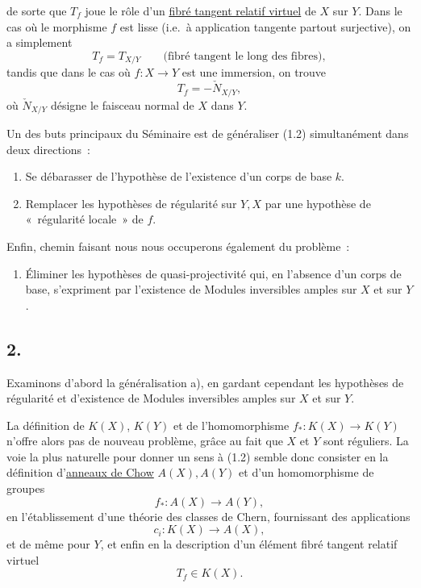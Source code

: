 de
sorte que $T_f$ joue le rôle d'un \underline{fibré tangent relatif virtuel} de $X$ sur $Y$. Dans le cas où le morphisme $f$ est lisse (i.e.\ à application tangente partout surjective), on a simplement
\[
T_f=T_{X/Y}\qquad\text{(fibré tangent le long des fibres)},
\]
tandis que dans le cas où $f:X\to Y$ est une immersion, on trouve
\[
T_f=-\check N_{X/Y},
\]
où $\check N_{X/Y}$ désigne le faisceau normal de $X$ dans $Y$.

Un des buts principaux du Séminaire est de généraliser (1.2) simultanément dans deux directions~:
\begin{enumerate}[label=\alph*)]
\item Se débarasser de l'hypothèse de l'existence d'un corps de base $k$.
\item Remplacer les hypothèses de régularité sur $Y,X$ par une hypothèse de «~régularité locale~» de $f$.
\end{enumerate}
Enfin, chemin faisant nous nous occuperons également du problème~:
\begin{enumerate}[label=\alph*),start=3]
\item Éliminer les hypothèses de quasi-projectivité qui, en l'absence d'un corps de base, s'expriment par l'existence de Modules inversibles amples sur $X$ et sur $Y$.
\end{enumerate}

\subsection*{2.}
Examinons d'abord la généralisation a), en gardant cependant les hypothèses de régularité et d'existence de Modules inversibles amples sur $X$ et sur $Y$.

La définition de $K(X)$, $K(Y)$ et de l'homomorphisme $f_*:K(X)\to K(Y)$ n'offre alors pas de nouveau problème, grâce au fait que $X$ et $Y$ sont réguliers. La voie la plus naturelle pour donner un sens à (1.2) semble donc consister en la définition d'\underline{anneaux de Chow} $A(X),A(Y)$ et d'un homomorphisme de groupes
\[
f_*:A(X)\longrightarrow A(Y),
\]
en l'établissement d'une théorie des classes de Chern, fournissant des applications
\[
c_i:K(X)\longrightarrow A(X),
\]
et de même pour $Y$, et enfin en la description d'un élément fibré tangent relatif virtuel
\[
T_f\in K(X).
\]

